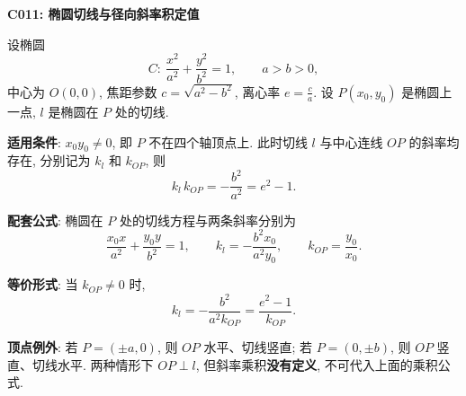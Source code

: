 \begin{statementbox}
\textbf{C011: 椭圆切线与径向斜率积定值}

设椭圆
\[
C:\ \frac{x^2}{a^2}+\frac{y^2}{b^2}=1,\qquad a>b>0,
\]
中心为 $O(0,0)$, 焦距参数 $c=\sqrt{a^2-b^2}$, 离心率 $e=\frac ca$.
设 $P(x_0,y_0)$ 是椭圆上一点, $l$ 是椭圆在 $P$ 处的切线.

\textbf{适用条件}: $x_0y_0\ne 0$, 即 $P$ 不在四个轴顶点上.
此时切线 $l$ 与中心连线 $OP$ 的斜率均存在, 分别记为 $k_l$ 和 $k_{OP}$, 则
\[
\boxed{k_l\,k_{OP}=-\frac{b^2}{a^2}=e^2-1.}
\]

\textbf{配套公式}: 椭圆在 $P$ 处的切线方程与两条斜率分别为
\[
\frac{x_0x}{a^2}+\frac{y_0y}{b^2}=1,\qquad
k_l=-\frac{b^2x_0}{a^2y_0},\qquad
k_{OP}=\frac{y_0}{x_0}.
\]

\textbf{等价形式}: 当 $k_{OP}\ne0$ 时,
\[
k_l=-\frac{b^2}{a^2k_{OP}}=\frac{e^2-1}{k_{OP}}.
\]

\textbf{顶点例外}: 若 $P=(\pm a,0)$, 则 $OP$ 水平、切线竖直;
若 $P=(0,\pm b)$, 则 $OP$ 竖直、切线水平.
两种情形下 $OP\perp l$, 但斜率乘积\textbf{没有定义}, 不可代入上面的乘积公式.
\end{statementbox}
